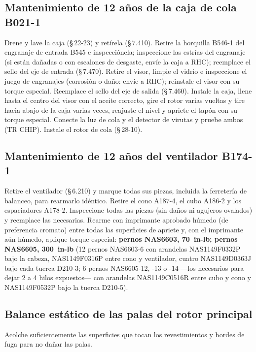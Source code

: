 \subsection{Mantenimiento de 12 años de la caja de cola B021-1}

Drene y lave la caja (\S\,22-23) y retírela (\S\,7.410). Retire la horquilla B546-1 del engranaje de entrada B545 e inspecciónela; inspeccione las estrías del engranaje (si están dañadas o con escalones de desgaste, envíe la caja a RHC); reemplace el sello del eje de entrada (\S\,7.470). Retire el visor, limpie el vidrio e inspeccione el juego de engranajes (corrosión o daño: envíe a RHC); reinstale el visor con su torque especial. Reemplace el sello del eje de salida (\S\,7.460). Instale la caja, llene hasta el centro del visor con el aceite correcto, gire el rotor varias vueltas y tire hacia abajo de la caja varias veces, reajuste el nivel y apriete el tapón con su torque especial. Conecte la luz de cola y el detector de virutas y pruebe ambos (\textsf{TR CHIP}). Instale el rotor de cola (\S\,28-10).

\subsection{Mantenimiento de 12 años del ventilador B174-1}

Retire el ventilador (\S\,6.210) y marque todas sus piezas, incluida la ferretería de balanceo, para rearmarlo idéntico. Retire el cono A187-4, el cubo A186-2 y los espaciadores A178-2. Inspeccione todas las piezas (sin daños ni agujeros ovalados) y reemplace las necesarias. Rearme con imprimante aprobado húmedo (de preferencia cromato) entre todas las superficies de apriete y, con el imprimante aún húmedo, aplique torque especial: \textbf{pernos NAS6603, 70~in-lb; pernos NAS6605, 300~in-lb} (12 pernos NAS6603-6 con arandelas NAS1149F0332P bajo la cabeza, NAS1149F0316P entre cono y ventilador, cuatro NAS1149D0363J bajo cada tuerca D210-3; 6 pernos NAS6605-12, -13 o -14 ---los necesarios para dejar 2 a 4 hilos expuestos--- con arandelas NAS1149C0516R entre cubo y cono y NAS1149F0532P bajo la tuerca D210-5).

\subsection{Balance estático de las palas del rotor principal}

\begin{precaucion}
Acolche suficientemente las superficies que tocan los revestimientos y bordes de fuga para no dañar las palas.
\end{precaucion}

